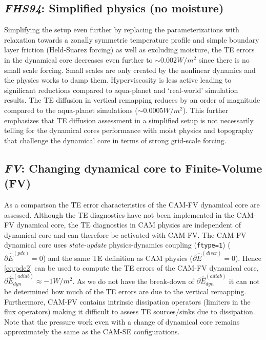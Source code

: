 \documentclass{agujournal}
\newcommand*{\gi}[1]{\widehat{#1}}
\begin{document}
\subsection{{\em{FHS94}}: Simplified physics (no moisture)}\label{sec:FHS94}
Simplifying the setup even further by replacing the parameterizations with relaxation towards a zonally symmetric temperature profile and simple boundary layer friction (Held-Suarez forcing) as well as excluding moisture, the TE errors in the dynamical core decreases even further to $\sim 0.002W/m^2$ since there is no small scale forcing. Small scales are only created by the nonlinear dynamics and the physics works to damp them. Hyperviscosity is less active leading to significant reductions compared to aqua-planet and `real-world' simulation results. The TE diffusion in vertical remapping reduces by an order of magnitude compared to the aqua-planet simulations ($\sim 0.0005W/m^2$). This further emphasizes that TE diffusion assessment in a simplified setup is not necessarily telling for the dynamical cores performance with moist physics and topography that challenge the dynamical core in terms of strong grid-scale forcing.
\subsection{{\em{FV}}: Changing dynamical core to Finite-Volume (FV)}\label{sec:cam-fv}
As a comparison the TE error characteristics of the CAM-FV dynamical core are assessed. Although the TE diagnostics have not been implemented in the CAM-FV dynamical core, the TE diagnostics in CAM physics are independent of dynamical core and can therefore be activated with CAM-FV. The CAM-FV dynamical core uses {\em{state-update}} physics-dynamics coupling ({\tt{ftype=1}}) ($\partial \gi{E}^{(pdc)}=0$) and the same TE definition as CAM physics ($\partial \gi{E}^{(discr)}=0$). Hence \eqref{eq:pdc2} can be used to compute the TE errors of the CAM-FV dynamical core, $\partial \gi{E}^{(adiab)}_{dyn}\approx -1 W/m^2$. As we do not have the break-down of $\partial \gi{E}^{(adiab)}_{dyn}$ it can not be determined how much of the TE errors are due to the vertical remapping. Furthermore, CAM-FV contains intrinsic dissipation operators (limiters in the flux operators) making it difficult to assess TE sources/sinks due to dissipation. Note that the pressure work even with a change of dynamical core remains approximately the same as the CAM-SE configurations.
\end{document}
